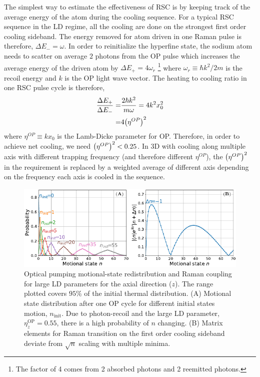 The simplest way to estimate the effectiveness of RSC
is by keeping track of the average energy of the atom during the cooling sequence.
For a typical RSC sequence in the LD regime, all the cooling are done on
the strongest first order cooling sideband.
The energy removed for atom driven in one Raman pulse is therefore, $\Delta E_-=\omega$.
In order to reinitialize the hyperfine state, the sodium atom needs to scatter on average
$2$ photons from the OP pulse which increases the average energy of the driven atom
by $\Delta E_+=4\omega_r$
\footnote{The factor of 4 comes from 2 absorbed photons and 2 reemitted photons.}
where $\omega_r\equiv \hbar k^2/2m$ is the recoil energy\cite{steck_sodium_nodate}
and $k$ is the OP light wave vector.
The heating to cooling ratio in one RSC pulse cycle is therefore,
\begin{align*}
  \frac{\Delta E_+}{\Delta E_-}=&\frac{2\hbar k^2}{m\omega}=4k^2x_0^2\\
  =&4{\left({\eta^{OP}}\right)}^2
\end{align*}
where $\eta^{OP}\equiv kx_0$ is the Lamb-Dicke parameter for OP.
Therefore, in order to achieve net cooling, we need ${\left({\eta^{OP}}\right)}^2<0.25$.
In 3D with cooling along multiple axis with different trapping frequency
(and therefore different $\eta^{OP}$), the ${\left({\eta^{OP}}\right)}^2$ in the requirement
is replaced by a weighted average of different axis depending on the frequency
each axis is cooled in the sequence.

\begin{figure}
  \centering
  \includegraphics[width=\textwidth]{figures/na_rsc_challenges.pdf}
  \caption[Optical pumping motional-state redistribution and Raman coupling]{
    Optical pumping motional-state redistribution and Raman coupling for large LD parameters
    for the axial direction ($z$).
    The range plotted covers $95$\% of the initial thermal distribution.
    (A) Motional state distribution after one OP cycle for different initial states motion,
    $n_{\textrm{init}}$.
    Due to photon-recoil and the large LD parameter, $\eta^{\textrm{OP}}_z=0.55$,
    there is a high probability of $n$ changing.
    (B) Matrix elements for Raman transition on the first order cooling sideband
    deviate from $\sqrt{n}$ scaling with multiple minima.
    \label{fig:na-rsc-challenges}}
\end{figure}

